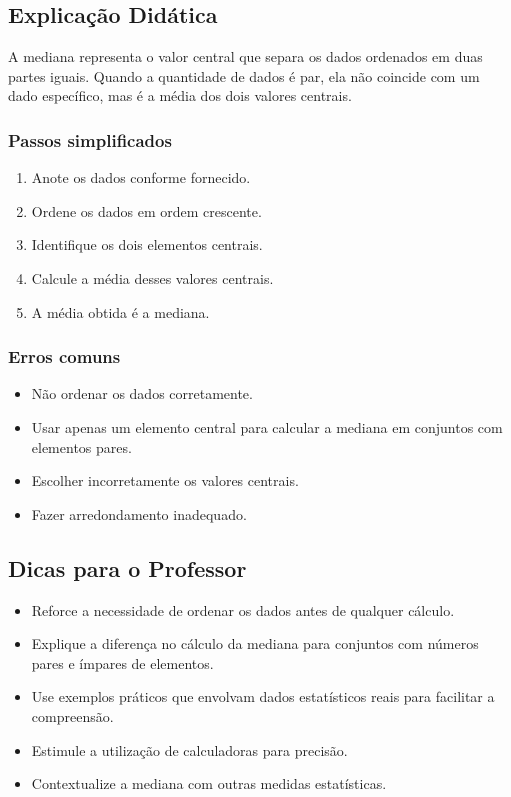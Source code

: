 \documentclass{article}
\begin{document}
\subsection*{Explicação Didática}
A mediana representa o valor central que separa os dados ordenados em duas partes iguais. Quando a quantidade de dados é par, ela não coincide com um dado específico, mas é a média dos dois valores centrais.

\subsubsection*{Passos simplificados}
\begin{enumerate}
\item Anote os dados conforme fornecido.
\item Ordene os dados em ordem crescente.
\item Identifique os dois elementos centrais.
\item Calcule a média desses valores centrais.
\item A média obtida é a mediana.
\end{enumerate}

\subsubsection*{Erros comuns}
\begin{itemize}
\item Não ordenar os dados corretamente.
\item Usar apenas um elemento central para calcular a mediana em conjuntos com elementos pares.
\item Escolher incorretamente os valores centrais.
\item Fazer arredondamento inadequado.
\end{itemize}

\subsection*{Dicas para o Professor}
\begin{itemize}
\item Reforce a necessidade de ordenar os dados antes de qualquer cálculo.
\item Explique a diferença no cálculo da mediana para conjuntos com números pares e ímpares de elementos.
\item Use exemplos práticos que envolvam dados estatísticos reais para facilitar a compreensão.
\item Estimule a utilização de calculadoras para precisão.
\item Contextualize a mediana com outras medidas estatísticas.
\end{itemize}
\end{document}
